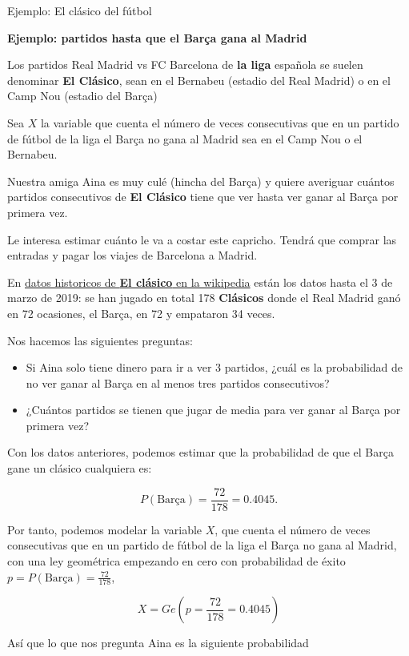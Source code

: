 \documentclass[
  letterpaper,
  DIV=11,
  numbers=noendperiod]{scrreprt}
\providecommand{\tightlist}{%
  \setlength{\itemsep}{0pt}\setlength{\parskip}{0pt}}\usepackage{longtable,booktabs,array}
\begin{document}
\begin{Ejemplo}{Ejemplo: El clásico del fútbol}{}

\textbf{Ejemplo: partidos hasta que el Barça gana al Madrid}

Los partidos Real Madrid vs FC Barcelona de \textbf{la liga} española se
suelen denominar \textbf{El Clásico}, sean en el Bernabeu (estadio del
Real Madrid) o en el Camp Nou (estadio del Barça)

Sea \(X\) la variable que cuenta el número de veces consecutivas que en
un partido de fútbol de la liga el Barça no gana al Madrid sea en el
Camp Nou o el Bernabeu.

Nuestra amiga Aina es muy culé (hincha del Barça) y quiere averiguar
cuántos partidos consecutivos de \textbf{El Clásico} tiene que ver hasta
ver ganar al Barça por primera vez.

Le interesa estimar cuánto le va a costar este capricho. Tendrá que
comprar las entradas y pagar los viajes de Barcelona a Madrid.

En \href{https://es.wikipedia.org/wiki/El_Cl\%C3\%A1sico}{datos
historicos de \textbf{El clásico} en la wikipedia} están los datos hasta
el 3 de marzo de 2019: se han jugado en total 178 \textbf{Clásicos}
donde el Real Madrid ganó en 72 ocasiones, el Barça, en 72 y empataron
34 veces.

Nos hacemos las siguientes preguntas:

\begin{itemize}
\tightlist
\item
  Si Aina solo tiene dinero para ir a ver 3 partidos, ¿cuál es la
  probabilidad de no ver ganar al Barça en al menos tres partidos
  consecutivos?
\item
  ¿Cuántos partidos se tienen que jugar de media para ver ganar al Barça
  por primera vez?
\end{itemize}

Con los datos anteriores, podemos estimar que la probabilidad de que el
Barça gane un clásico cualquiera es:

\[P(\mbox{Barça})=\frac{72}{178}=0.4045.\]

Por tanto, podemos modelar la variable \(X\), que cuenta el número de
veces consecutivas que en un partido de fútbol de la liga el Barça no
gana al Madrid, con una ley geométrica empezando en cero con
probabilidad de éxito \(p=P(\mbox{Barça})=\frac{72}{178}\),

\[X=Ge\left(p=\frac{72}{178}=0.4045\right)\]

Así que lo que nos pregunta Aina es la siguiente probabilidad


\end{Ejemplo}
\end{document}
